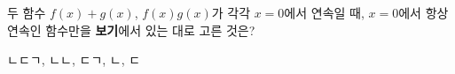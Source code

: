 두 함수 $f(x)+g(x)$, $f(x)g(x)$가 각각 $x=0$에서 연속일 때, $x=0$에서 항상 연속인 함수만을 \textbf{보기}에서 있는 대로 고른 것은? 
\begin{choices32}{ㄴ}{ㄷ}{ㄱ, ㄴ}{ㄴ, ㄷ}{ㄱ, ㄴ, ㄷ}\end{choices32}
